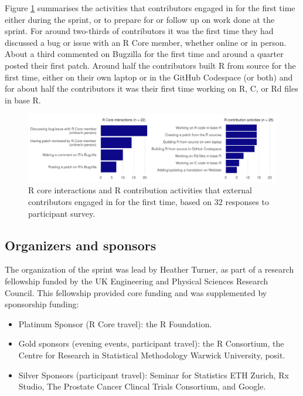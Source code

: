 Figure \ref{fig:firsts} summarises the activities that contributors engaged in for the first time either during the sprint, or to prepare for or follow up on work done at the sprint. For around two-thirds of contributors it was the first time they had discussed a bug or issue with an R Core member, whether online or in person. About a third commented on Bugzilla for the first time and around a quarter posted their first patch. Around half the contributors built R from source for the first time, either on their own laptop or in the GitHub Codespace (or both) and for about half the contributors it was their first time working on R, C, or Rd files in base R.

\begin{figure}
\includegraphics[width=1\linewidth]{figures/first_activities} \caption{R core interactions and R contribution activities that external contributors engaged in for the first time, based on 32 responses to participant survey.}\label{fig:firsts}
\end{figure}

\hypertarget{organizers-and-sponsors}{%
\subsection{Organizers and sponsors}\label{organizers-and-sponsors}}

The organization of the sprint was lead by Heather Turner, as part of a
research fellowship funded by the UK Engineering and Physical Sciences Research Council. This fellowship provided core funding and was supplemented by sponsorship funding:

\begin{itemize}
\tightlist
\item
  Platinum Sponsor (R Core travel): the R Foundation.
\item
  Gold sponsors (evening events, participant travel): the R Consortium, the Centre for Research in Statistical Methodology Warwick University, posit.
\item
  Silver Sponsors (participant travel): Seminar for Statistics ETH Zurich, Rx Studio, The Prostate Cancer Clincal Trials Consortium, and Google.
\end{itemize}

